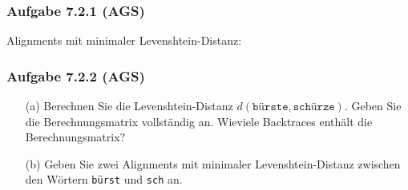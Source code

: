 \documentclass{beamer}
\begin{document}
\begin{frame}[t] \frametitle{Aufgabe 7.2.1 (AGS) \hfill {}}
	Alignments mit minimaler Levenshtein-Distanz:
	
	\centering
\end{frame}


\begin{frame} \frametitle{Aufgabe 7.2.2 (AGS)}
	\begin{itemize}
		\item[(a)] Berechnen Sie die Levenshtein-Distanz $d(\texttt{bürste}, \texttt{schürze})$. Geben Sie die Berechnungsmatrix vollständig an. Wieviele Backtraces enthält die Berechnungsmatrix?
		\item[(b)] Geben Sie zwei Alignments mit minimaler Levenshtein-Distanz zwischen den Wörtern
		\texttt{bürst} und \texttt{sch} an.
	\end{itemize}
\end{frame}
\end{document}
